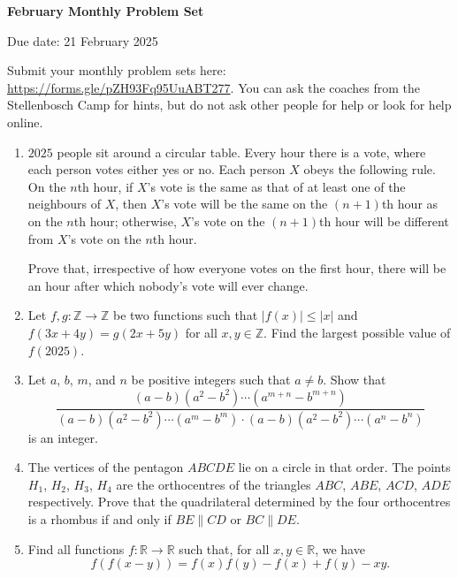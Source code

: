 \documentclass[12pt]{article}
\begin{document}
\begin{center} \bfseries \large
    February Monthly Problem Set

    Due date: 21 February 2025
\end{center}

\bigskip
Submit your monthly problem sets here: \url{https://forms.gle/pZH93Fq95UuABT277}.
You can ask the coaches from the Stellenbosch Camp for hints, but do not ask other people for help or look for help online.

\begin{enumerate}[topsep=\bigskipamount,itemsep=\bigskipamount]
\item %
$2025$ people sit around a circular table.
Every hour there is a vote, where each person votes either yes or no.
Each person $X$ obeys the following rule.
On the $n$th hour, if $X$'s vote is the same as that of at least one of the neighbours of $X$, then $X$'s vote will be the same on the $(n+1)$th hour as on the $n$th hour; otherwise, $X$'s vote on the $(n+1)$th hour will be different from $X$'s vote on the $n$th hour.

Prove that, irrespective of how everyone votes on the first hour, there will be an hour after which nobody's vote will ever change.

\item %
Let $f,g : \mathbb{Z} \to \mathbb{Z}$ be two functions such that $|f(x)| \leqslant |x|$ and $f(3x+4y) = g(2x+5y)$ for all $x,y \in \mathbb{Z}$.
Find the largest possible value of $f(2025)$.

\newcommand*{\parens}[1]{\left(#1\right)}
\item %
Let $a$, $b$, $m$, and $n$ be positive integers such that $a \neq b$. Show that
\[ \frac{\parens{a-b}\parens{a^2-b^2}\dotsb\parens{a^{m+n}-b^{m+n}}}{\parens{a-b}\parens{a^2-b^2}\dotsb\parens{a^m-b^m} \cdot \parens{a-b}\parens{a^2-b^2}\dotsb\parens{a^n-b^n}} \]
is an integer. 

\item %
The vertices of the pentagon $ABCDE$ lie on a circle in that order.
The points $H_1$, $H_2$, $H_3$, $H_4$ are the orthocentres of the triangles $ABC$, $ABE$, $ACD$, $ADE$ respectively.
Prove that the quadrilateral determined by the four orthocentres is a rhombus if and only if $BE\parallel CD$ or $BC\parallel DE$.

\item Find all functions \(f: \mathbb{R} \rightarrow \mathbb{R}\) such that, for all \(x, y \in \mathbb{R}\), we have
\[f(f(x - y)) = f(x)f(y) - f(x) + f(y) - xy.\]


\end{enumerate}
\end{document}
